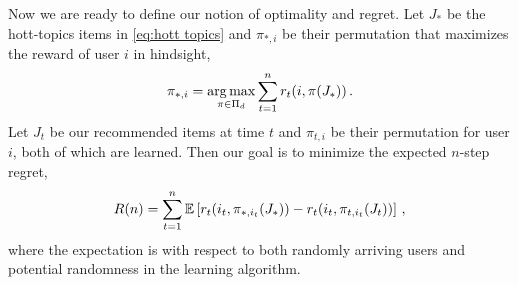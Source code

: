 Now we are ready to define our notion of optimality and regret. Let $J_\ast$ be the hott-topics items in \eqref{eq:hott topics} and $\pi_{\ast, i}$ be their permutation that maximizes the reward of user $i$ in hindsight,
\begin{align*}
  \pi_{\ast, i} =
  \mathop{\rm arg\,max}_{\pi \in \Pi_d} \sum_{t = 1}^n r_t(i, \pi(J_\ast))\,.
\end{align*}
Let $J_t$ be our recommended items at time $t$ and $\pi_{t, i}$ be their permutation for user $i$, both of which are learned. Then our goal is to minimize the expected $n$-step regret,
\begin{align}
  R(n) =
  \sum_{t = 1}^n \mathbb{E}\left[r_t(i_t, \pi_{\ast, i_t}(J_\ast)) - r_t(i_t, \pi_{t, i_t}(J_t))\right]\,,
  \label{eq:regret}
\end{align}
where the expectation is with respect to both randomly arriving users and potential randomness in the learning algorithm.

